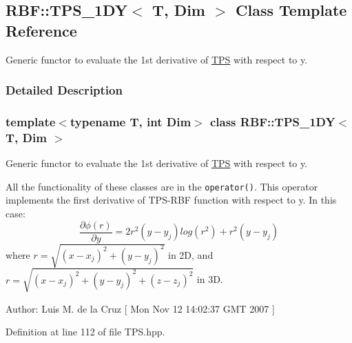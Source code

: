 \hypertarget{classRBF_1_1TPS__1DY}{
\subsection{RBF::TPS\_\-1DY$<$ T, Dim $>$ Class Template Reference}
\label{classRBF_1_1TPS__1DY}
}
Generic functor to evaluate the 1st derivative of \hyperlink{classRBF_1_1TPS}{TPS} with respect to y.  




\subsubsection{Detailed Description}
\subsubsection*{template$<$typename T, int Dim$>$ class RBF::TPS\_\-1DY$<$ T, Dim $>$}

Generic functor to evaluate the 1st derivative of \hyperlink{classRBF_1_1TPS}{TPS} with respect to y. 

All the functionality of these classes are in the {\tt operator()}. This operator implements the first derivative of TPS-RBF function with respect to y. In this case: \[ \frac{\partial \phi(r)}{\partial y} = 2 r^2(y - y_j)log(r^2) + r^2(y - y_j) \] where $ r = \sqrt{(x - x_j)^2 + (y - y_j)^2} $ in 2D, and $ r = \sqrt{(x - x_j)^2 + (y - y_j)^2 + (z - z_j)^2} $ in 3D.

\begin{Desc}
\item[Author:]Luis M. de la Cruz \mbox{[} Mon Nov 12 14:02:37 GMT 2007 \mbox{]} \end{Desc}


Definition at line 112 of file TPS.hpp.